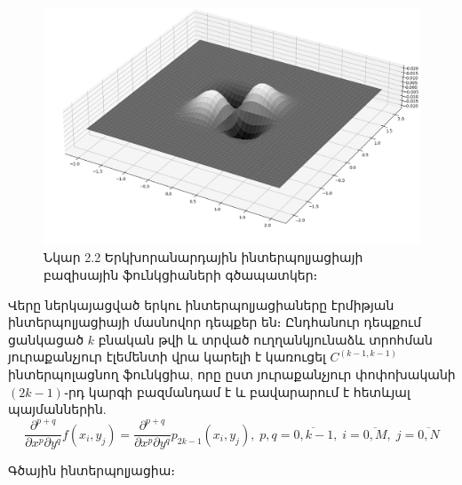 \documentclass[fleqn, bachelor,subf,12pt,notitlepage]{article}
\begin{document}
\begin{figure}[H]
\begin{minipage}[b]{0.45\textwidth}
  \end{minipage}
\hfill
  \begin{minipage}[b]{0.45\textwidth}
    \includegraphics[width=\textwidth]{images/two_dimensional_ermite_4}
  \end{minipage}
\captionsetup{labelformat=empty}
\caption{Նկար 2.2 Երկխորանարդային ինտերպոլյացիայի բազիսային ֆունկցիաների գծապատկեր։}
\end{figure}

Վերը ներկայացված երկու ինտերպոլյացիաները էրմիթյան ինտերպոլյացիայի մասնովոր դեպքեր են։
Ընդհանուր դեպքում ցանկացած $k$ բնական թվի և տրված ուղղանկյունաձև տրոհման յուրաքանչյուր էլեմենտի վրա կարելի է կառուցել $C^{\left(k-1, k-1\right)}$ ինտերպոլացնող ֆունկցիա, որը ըստ յուրաքանչյուր փոփոխականի $\left(2k-1\right)$֊րդ կարգի բազմանդամ է և բավարարում է հետևյալ պայմաններին.
\begin{equation}
\dfrac{\partial^{p+q}}{\partial x^{p} \partial y^{q}}f\left(x_{i}, y_{j}\right)=\dfrac{\partial^{p+q}}{\partial x^{p} \partial y^{q}}p_{2k-1}\left(x_{i}, y_{j}\right), \; p,q=\overline{0, k-1}, \;  i=\overline{0, M}, \; j=\overline{0, N}
\end{equation}

\noindent Գծային ինտերպոլյացիա։
\end{document}
